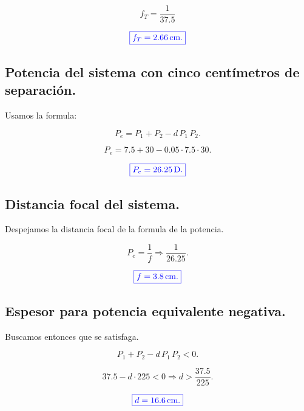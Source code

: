 \documentclass[a4paper,12pt]{article} %
\begin{document}
\[ f_T = \frac{1}{37.5} \]

\vspace{\baselineskip}

\[\textcolor{blue}{\boxed{f_T = 2.66 \, \mathrm{cm}.}}\]

\vspace{\baselineskip}

\subsection{Potencia del sistema con cinco centímetros de separación.}

\begin{justify}
	Usamos la formula:
\end{justify}

\[P_e = P_1 + P_2 - d \,P_1 \, P_2. \]

\[P_e = 7.5 + 30 - 0.05 \cdot 7.5 \cdot 30. \]

\[\textcolor{blue}{\boxed{P_e = 26.25 \, \mathrm{D}.}}\]
\vspace{\baselineskip}

\subsection{Distancia focal del sistema.}

\begin{justify}
	Despejamos la distancia focal de la formula de la potencia.
\end{justify}

\[ P_e = \frac{1}{f} \Rightarrow \frac{1}{26.25}.\]

\[\textcolor{blue}{\boxed{f = 3.8 \, \mathrm{cm}.}} \]

\vspace{\baselineskip}

\subsection{Espesor para potencia equivalente negativa.}

\begin{justify}
	Buscamos entonces que se satisfaga.
\end{justify}

\[ P_1 + P_2 - d \,P_1 \, P_2 < 0. \]

\[ 37.5 - d \cdot 225 < 0 \Rightarrow d > \frac{37.5}{225}. \]

\[\textcolor{blue}{\boxed{d = 16.6 \, \mathrm{cm}.}}\]
\end{document}
